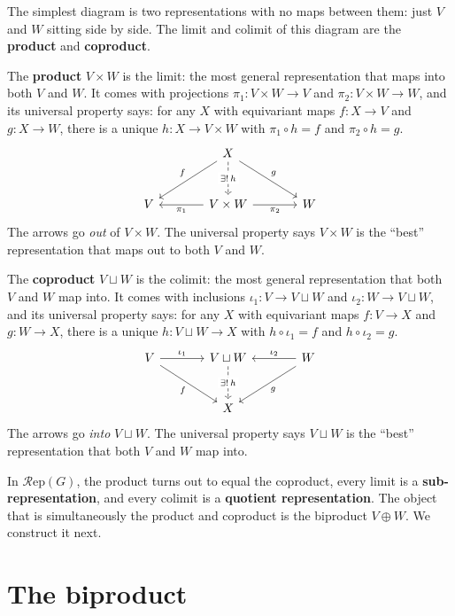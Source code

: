 \documentclass[12pt,a4paper]{article}
\theoremstyle{definition}
\theoremstyle{remark}
\newcommand{\Rep}{\mathcal{R}\mathrm{ep}}
\begin{document}
The simplest diagram is two representations with no maps between them: just
$V$ and $W$ sitting side by side. The limit and colimit of this diagram are the
\textbf{product} and \textbf{coproduct}.

The \textbf{product} $V \times W$ is the limit: the most general representation
that maps into both $V$ and $W$. It comes with projections $\pi_1\colon V \times W \to V$
and $\pi_2\colon V \times W \to W$, and its universal property says: for any $X$ with
equivariant maps $f\colon X \to V$ and $g\colon X \to W$, there is a unique
$h\colon X \to V \times W$ with $\pi_1 \circ h = f$ and $\pi_2 \circ h = g$.
\[
\begin{tikzcd}[row sep=large, column sep=large]
& X \arrow[dl, "f"'] \arrow[d, dashed, "\exists! \, h" description] \arrow[dr, "g"] & \\
V & V \times W \arrow[l, "\pi_1"] \arrow[r, "\pi_2"'] & W
\end{tikzcd}
\]
The arrows go \emph{out} of $V \times W$. The universal property says $V \times W$ is
the ``best'' representation that maps out to both $V$ and $W$.

The \textbf{coproduct} $V \sqcup W$ is the colimit: the most general representation
that both $V$ and $W$ map into. It comes with inclusions $\iota_1\colon V \to V \sqcup W$
and $\iota_2\colon W \to V \sqcup W$, and its universal property says: for any $X$ with
equivariant maps $f\colon V \to X$ and $g\colon W \to X$, there is a unique
$h\colon V \sqcup W \to X$ with $h \circ \iota_1 = f$ and $h \circ \iota_2 = g$.
\[
\begin{tikzcd}[row sep=large, column sep=large]
V \arrow[r, "\iota_1"] \arrow[dr, "f"'] & V \sqcup W \arrow[d, dashed, "\exists! \, h" description]
  & W \arrow[l, "\iota_2"'] \arrow[dl, "g"] \\
& X &
\end{tikzcd}
\]
The arrows go \emph{into} $V \sqcup W$. The universal property says $V \sqcup W$ is
the ``best'' representation that both $V$ and $W$ map into.

\medskip

In $\Rep(G)$, the product turns out to equal the coproduct, every limit is a
\textbf{sub-representation}, and every colimit is a \textbf{quotient representation}.
The object that is simultaneously the product and coproduct is the biproduct
$V \oplus W$. We construct it next.

\section{The biproduct}
\end{document}
